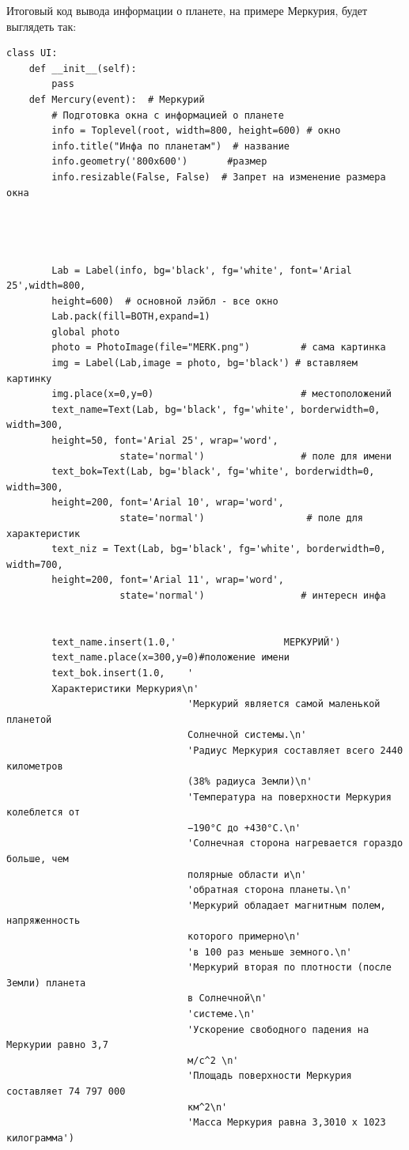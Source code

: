 \documentclass[11pt,a4paper]{report}
\begin{document}
\newpage
Итоговый код вывода информации о планете, на примере Меркурия, будет выглядеть так:
\begin{verbatim}
class UI:
    def __init__(self):
        pass
    def Mercury(event):  # Меркурий
        # Подготовка окна с информацией о планете
        info = Toplevel(root, width=800, height=600) # окно
        info.title("Инфа по планетам")  # название
        info.geometry('800x600')       #размер
        info.resizable(False, False)  # Запрет на изменение размера окна
        
        
        
    
        Lab = Label(info, bg='black', fg='white', font='Arial 25',width=800,
        height=600)  # основной лэйбл - все окно
        Lab.pack(fill=BOTH,expand=1)
        global photo
        photo = PhotoImage(file="MERK.png")         # сама картинка
        img = Label(Lab,image = photo, bg='black') # вставляем картинку
        img.place(x=0,y=0)                          # местоположений
        text_name=Text(Lab, bg='black', fg='white', borderwidth=0, width=300, 
        height=50, font='Arial 25', wrap='word',
                    state='normal')                 # поле для имени
        text_bok=Text(Lab, bg='black', fg='white', borderwidth=0, width=300, 
        height=200, font='Arial 10', wrap='word',
                    state='normal')                  # поле для характеристик
        text_niz = Text(Lab, bg='black', fg='white', borderwidth=0, width=700, 
        height=200, font='Arial 11', wrap='word',
                    state='normal')                 # интересн инфа
    
       
        text_name.insert(1.0,'                   МЕРКУРИЙ')
        text_name.place(x=300,y=0)#положение имени
        text_bok.insert(1.0,    '                                           
        Характеристики Меркурия\n' 
                                'Меркурий является самой маленькой планетой 
                                Солнечной системы.\n'
                                'Радиус Меркурия составляет всего 2440 километров 
                                (38% радиуса Земли)\n'
                                'Температура на поверхности Меркурия колеблется от 
                                −190°C до +430°C.\n'
                                'Солнечная сторона нагревается гораздо больше, чем 
                                полярные области и\n'
                                'обратная сторона планеты.\n'
                                'Меркурий обладает магнитным полем, напряженность 
                                которого примерно\n' 
                                'в 100 раз меньше земного.\n'
                                'Меркурий вторая по плотности (после Земли) планета 
                                в Солнечной\n'
                                'системе.\n'
                                'Ускорение свободного падения на Меркурии равно 3,7
                                м/c^2 \n'
                                'Площадь поверхности Меркурия составляет 74 797 000 
                                км^2\n' 
                                'Масса Меркурия равна 3,3010 х 1023 килограмма')
        

\end{verbatim}
\end{document}
